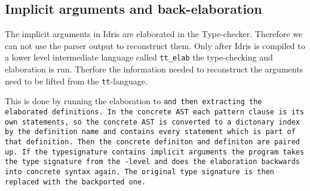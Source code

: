 \subsection{Implicit arguments and back-elaboration}
The implicit arguments in Idris are elaborated in the Type-checker. Therefore
we can not use the parser output to reconstruct them.  Only after Idris is
compiled to a lower level intermediate language called \texttt{tt\_elab} the
type-checking and elaboration is run. Therfore the information needed to
reconstruct the arguments need to be lifted from the \texttt{tt}-language.

This is done by running the elaboration to \tt and then extracting the
elaborated definitions. In the concrete AST each pattern clause is its own
statements, so the concrete AST is converted to a dictonary index by the
definition name and contains every statement which is part of that definition.
Then the concrete definiton and \tt definiton are paired up. If the
typesignature contains implicit arguments the program takes the type signature
from the \tt-level and does the elaboration backwards into concrete syntax
again. The original type signature is then replaced with the backported one.


